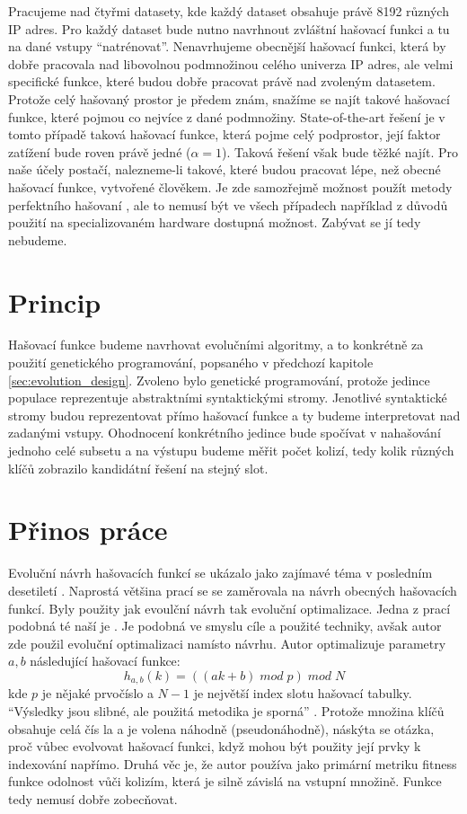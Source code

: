 Pracujeme nad čtyřmi datasety, kde každý dataset obsahuje právě 8192 různých 
IP adres. Pro každý dataset bude nutno navrhnout zvláštní hašovací funkci a tu
na dané vstupy ``natrénovat''. Nenavrhujeme obecnější hašovací funkci, která by dobře
pracovala nad libovolnou podmnožinou celého univerza IP adres, ale velmi
specifické funkce, které budou dobře pracovat právě nad zvoleným datasetem.
Protože celý hašovaný prostor je předem znám, snažíme se najít takové hašovací
funkce, které pojmou co nejvíce z dané podmnožiny. State-of-the-art řešení je v
tomto případě taková hašovací funkce, která pojme celý podprostor, její 
faktor zatížení bude roven právě jedné ($\alpha = 1$). Taková řešení však
bude těžké najít. Pro naše účely postačí, nalezneme-li takové, které budou
pracovat lépe, než obecné hašovací funkce, vytvořené člověkem. Je zde samozřejmě
možnost použít metody perfektního hašovaní \cite{perfect_hashing}, ale to nemusí
být ve všech případech například z důvodů použití na specializovaném hardware
dostupná možnost. Zabývat se jí tedy nebudeme.

\section{Princip}
Hašovací funkce budeme navrhovat evolučními algoritmy, a to konkrétně za použití 
genetického programování, popsaného v předchozí kapitole \ref{sec:evolution_design}.
Zvoleno bylo genetické programování, protože 
jedince populace reprezentuje abstraktními syntaktickými stromy. Jenotlivé syntaktické 
stromy budou reprezentovat přímo hašovací funkce a ty budeme interpretovat nad zadanými vstupy.
Ohodnocení konkrétního jedince bude spočívat v nahašování jednoho celé subsetu a na výstupu budeme
měřit počet kolizí, tedy kolik různých klíčů zobrazilo kandidátní řešení na stejný slot.

\section{Přinos práce}
Evoluční návrh hašovacích funkcí se ukázalo jako zajímavé téma v posledním 
desetiletí \cite{dobai0,NCHF_auto_design,grammar_evolution,safdari}.
Naprostá většina prací se se zaměrovala na návrh obecných hašovacích
funkcí. Byly použity jak evoulční návrh tak evoluční optimalizace. Jedna z prací
podobná té naší je \cite{safdari}. Je podobná ve smyslu cíle a použité techniky,
avšak autor zde použil evoluční optimalizaci namísto návrhu. Autor optimalizuje
parametry $a,b$ následující hašovací funkce:
$$h_{a,b}(k) = ((ak + b) \; mod \; p) \; mod \; N$$
kde $p$ je nějaké prvočíslo a $N - 1$ je největší index slotu hašovací tabulky.
``Výsledky jsou slibné, ale použitá metodika je sporná'' \cite{NCHF_auto_design}.
Protože množina klíčů obsahuje celá čís	la a je volena náhodně (pseudonáhodně), náskýta se otázka,
proč vůbec evolvovat hašovací funkci, když mohou být použity její prvky k indexování
napřímo. Druhá věc je, že autor používa jako primární metriku fitness funkce odolnost
vůči kolizím, která je silně závislá na vstupní množině. Funkce tedy nemusí dobře 
zobecňovat.

